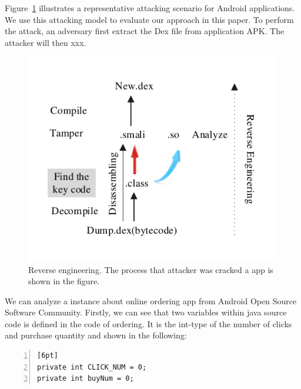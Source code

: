 Figure~\ref {fig:Figure 2} illustrates a representative attacking scenario for Android applications. We use this attacking model to evaluate our approach in this paper. To perform the attack, an adversary first extract the Dex file from application APK. The attacker will then xxx.


\begin{figure}[!tbp]
  \centering
  \includegraphics[width=0.8\columnwidth]{fig/fig2.pdf}
  \caption{Reverse engineering. The process that attacker was cracked a app is shown in the figure. }\label{fig:Figure 2}
\end{figure}

We can analyze a instance about online ordering app from Android Open Source Software Community. Firstly, we can see that two variables within java source code is defined in the code of ordering. It is the int-type of the number of clicks and purchase quantity and shown in the following:


\begin{lstlisting}[language={[ANSI]C}, backgroundcolor=\color{backcolour},
numbers=left,numberstyle=\tiny,keywordstyle=\color{blue},commentstyle=\color{red!50!green!50!blue!50}][6pt]
private int CLICK_NUM = 0;
private int buyNum = 0;
\end{lstlisting}

